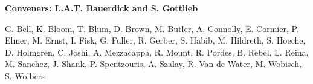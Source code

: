

\begin{center}

\begin{large} {\bf Conveners: L.A.T. Bauerdick and S. Gottlieb}\end{large}

G. Bell,
K. Bloom,
T. Blum,
D. Brown,
M. Butler,
A. Connolly,
E. Cormier,
P. Elmer,
M. Ernst,
I. Fisk,
G. Fuller,
R. Gerber,
S. Habib,
M. Hildreth,
S. Hoeche,
D. Holmgren,
C. Joshi,
A. Mezzacappa,
R. Mount,
R. Pordes,
B. Rebel,
L. Reina,
M. Sanchez,
J. Shank,
P. Spentzouris,
A. Szalay,
R. Van de Water,
M. Wobisch,
S. Wolbers


\end{center}

